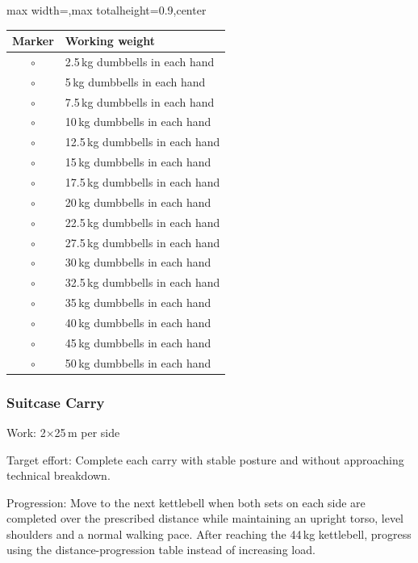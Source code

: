 \documentclass[11pt,a4paper]{article}
\newcommand{\tablearraystretch}{1.15}
\begin{document}
\begin{center}
\renewcommand{\arraystretch}{\tablearraystretch}
\begin{adjustbox}{max width=\linewidth,max totalheight=0.9\textheight,center}
\begin{tabular}{cl}
\toprule
Marker & Working weight \\
\midrule
$\circ$ & 2.5\,kg dumbbells in each hand \\
$\circ$ & 5\,kg dumbbells in each hand \\
$\circ$ & 7.5\,kg dumbbells in each hand \\
$\circ$ & 10\,kg dumbbells in each hand \\
$\circ$ & 12.5\,kg dumbbells in each hand \\
$\circ$ & 15\,kg dumbbells in each hand \\
$\circ$ & 17.5\,kg dumbbells in each hand \\
$\circ$ & 20\,kg dumbbells in each hand \\
$\circ$ & 22.5\,kg dumbbells in each hand \\
$\circ$ & 27.5\,kg dumbbells in each hand \\
$\circ$ & 30\,kg dumbbells in each hand \\
$\circ$ & 32.5\,kg dumbbells in each hand \\
$\circ$ & 35\,kg dumbbells in each hand \\
$\circ$ & 40\,kg dumbbells in each hand \\
$\circ$ & 45\,kg dumbbells in each hand \\
$\circ$ & 50\,kg dumbbells in each hand \\
\bottomrule
\end{tabular}
\end{adjustbox}
\renewcommand{\arraystretch}{1}
\end{center}

\newpage
\subsubsection{Suitcase Carry}

Work: 2$\times$25\,m per side

Target effort: Complete each carry with stable posture and without approaching technical breakdown.

Progression: Move to the next kettlebell when both sets on each side are completed over the prescribed distance while maintaining an upright torso, level shoulders and a normal walking pace. After reaching the 44\,kg kettlebell, progress using the distance-progression table instead of increasing load.
\end{document}
